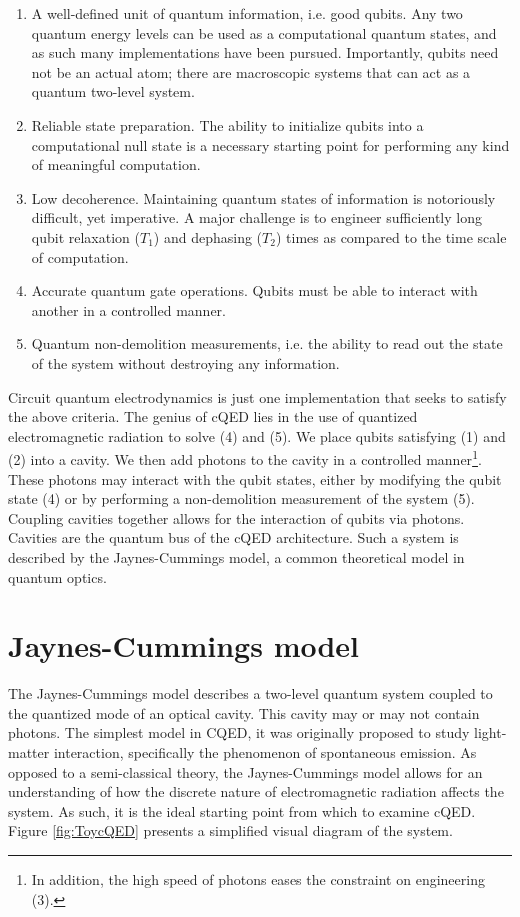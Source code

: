 \documentclass[12 pt]{book}
\begin{document}
\begin{enumerate}
\item A well-defined unit of quantum information, i.e. good qubits. Any two quantum energy levels can be used as a computational quantum states, and as such many implementations have been pursued. Importantly, qubits need not be an actual atom; there are macroscopic systems that can act as a quantum two-level system. 
\item Reliable state preparation. The ability to initialize qubits into a computational null state is a necessary starting point for performing any kind of meaningful computation.
\item Low decoherence. Maintaining quantum states of information is notoriously difficult, yet imperative.  A major challenge is to engineer sufficiently long qubit relaxation ($T_1$) and dephasing ($T_2$) times as compared to the time scale of computation. 
\item Accurate quantum gate operations. Qubits must be able to interact with another in a controlled manner. 
\item Quantum non-demolition  measurements, i.e. the ability to read out the state of the system without destroying any information. 
\end{enumerate}

Circuit quantum electrodynamics is just one implementation that seeks to satisfy the above criteria. The genius of cQED lies in the use of quantized electromagnetic radiation to solve (4) and (5). We place qubits satisfying (1) and (2) into a cavity. We then add photons to the cavity in a controlled manner\footnote{In addition, the high speed of photons eases the constraint on engineering (3).}. These photons may interact with the qubit states, either by modifying the qubit state (4) or by performing a non-demolition measurement of the system (5). Coupling cavities together allows for the interaction of qubits via photons. Cavities are the quantum bus of the cQED architecture. Such a system is described by the Jaynes-Cummings model, a common theoretical model in quantum optics. 



\section{Jaynes-Cummings model}\label{sec:JC}
The Jaynes-Cummings model describes a two-level quantum system coupled to the quantized mode of an optical cavity. This cavity may or may not contain photons. The simplest model in CQED, it was originally proposed to study light-matter interaction, specifically the phenomenon of spontaneous emission. As opposed to a semi-classical theory, the Jaynes-Cummings model allows for an understanding of how the discrete nature of electromagnetic radiation affects the system. As such, it is the ideal starting point from which to examine cQED. Figure \ref{fig:ToycQED} presents a simplified visual diagram of the system.
\end{document}
